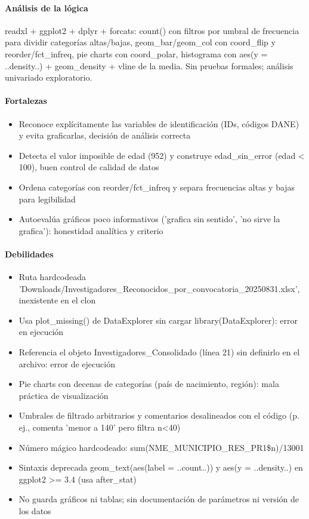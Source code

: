\paragraph{Análisis de la lógica}
readxl + ggplot2 + dplyr + forcats: count() con filtros por umbral de frecuencia para dividir categorías altas/bajas, geom\_bar/geom\_col con coord\_flip y reorder/fct\_infreq, pie charts con coord\_polar, histograma con aes(y = ..density..) + geom\_density + vline de la media. Sin pruebas formales; análisis univariado exploratorio.

\paragraph{Fortalezas}
\begin{itemize}
  \item Reconoce explícitamente las variables de identificación (IDs, códigos DANE) y evita graficarlas, decisión de análisis correcta
  \item Detecta el valor imposible de edad (952) y construye edad\_sin\_error (edad < 100), buen control de calidad de datos
  \item Ordena categorías con reorder/fct\_infreq y separa frecuencias altas y bajas para legibilidad
  \item Autoevalúa gráficos poco informativos ('grafica sin sentido', 'no sirve la grafica'): honestidad analítica y criterio
\end{itemize}

\paragraph{Debilidades}
\begin{itemize}
  \item Ruta hardcodeada 'Downloads/Investigadores\_Reconocidos\_por\_convocatoria\_20250831.xlsx', inexistente en el clon
  \item Usa plot\_missing() de DataExplorer sin cargar library(DataExplorer): error en ejecución
  \item Referencia el objeto Investigadores\_Consolidado (línea 21) sin definirlo en el archivo: error de ejecución
  \item Pie charts con decenas de categorías (país de nacimiento, región): mala práctica de visualización
  \item Umbrales de filtrado arbitrarios y comentarios desalineados con el código (p. ej., comenta 'menor a 140' pero filtra n<40)
  \item Número mágico hardcodeado: sum(NME\_MUNICIPIO\_RES\_PR1\$n)/13001
  \item Sintaxis deprecada geom\_text(aes(label = ..count..)) y aes(y = ..density..) en ggplot2 >= 3.4 (usa after\_stat)
  \item No guarda gráficos ni tablas; sin documentación de parámetros ni versión de los datos
\end{itemize}

